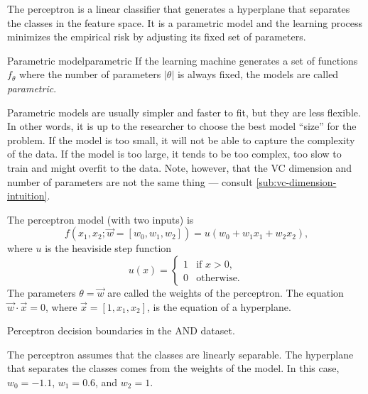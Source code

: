 The perceptron is a linear classifier that generates a hyperplane that separates the
classes in the feature space.  It is a parametric model and the learning process minimizes the empirical risk
by adjusting its fixed set of parameters.

\begin{defbox}{Parametric model}{parametric}
  If the learning machine generates a set of functions $f_\theta$ where the number of
  parameters $|\theta|$ is always fixed, the models are called \emph{parametric}.
\end{defbox}

Parametric models are usually simpler and faster to fit, but they are less flexible.  In
other words, it is up to the researcher to choose the best model ``size'' for the problem.
If the model is too small, it will not be able to capture the complexity of the data.  If
the model is too large, it tends to be too complex, too slow to train and might overfit to
the data.  Note, however, that the VC dimension and number of parameters are not the same
thing --- consult \cref{sub:vc-dimension-intuition}.

The perceptron model (with two inputs) is
\begin{equation*}
  f(x_1, x_2; \vec{w} = \left[w_0, w_1, w_2\right]) = u(w_0 + w_1 x_1 + w_2 x_2)\text{,}
\end{equation*}
where $u$ is the heaviside step function
\begin{equation*}
  u(x) = \begin{cases}
    1 & \text{if } x > 0\text{,} \\
    0 & \text{otherwise.}
  \end{cases}
\end{equation*}
The parameters $\theta = \vec{w}$ are called the weights of the perceptron.
The equation $\vec{w} \cdot \vec{x} = 0$, where $\vec{x} = [1, x_1,
x_2]$, is the equation of a hyperplane.

\begin{figurebox}[label=fig:perceptron-and]{Perceptron decision boundaries in the AND dataset.}
  \centering
  \tcblower
  The perceptron assumes that the classes are linearly separable.
  The hyperplane that separates the classes comes from the weights of the model.
  In this case, $w_0 = -1.1$, $w_1 = 0.6$, and $w_2 = 1$.
\end{figurebox}

